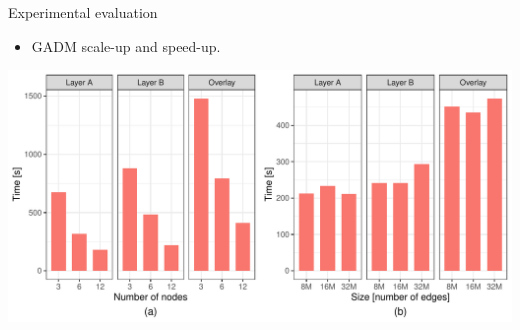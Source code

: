     \begin{frame}{Experimental evaluation}
        \begin{itemize}
            \item GADM scale-up and speed-up.
        \end{itemize}
        \vspace{5mm}
        \includegraphics[width=\textwidth]{../thesis/chapterSDCEL/GADM_SS/GADM_SS}
    \end{frame}

